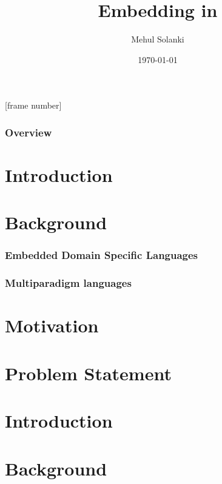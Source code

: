 \documentclass{beamer}
\title[]{Embedding  \progLang{Prolog} in \progLang{Haskell}} %
\author{Mehul Solanki} %
\institute[UNBC] %
{
	University of Northern British Columbia \newline \\ %
	\medskip
	\textit{solanki@unbc.ca} %
}
\date{\today} %
\begin{document}
	[frame number]
	\begin{frame}
		\titlepage %
	\end{frame}

\begin{frame}
\frametitle{Overview} %
\tableofcontents %
\end{frame}

\section{Introduction}

\section{Background}

\begin{frame}
\frametitle{Embedded Domain Specific Languages}
\end{frame}

\begin{frame}
\frametitle{Multiparadigm languages}
\end{frame}

\section{Motivation}

\section{Problem Statement}

\section{Introduction}

\section{Background}
\end{document}
